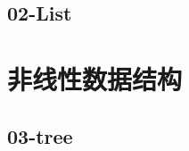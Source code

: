 \documentclass{beamer}
\begin{document}
\subsection{02-List}


% 
% 
% 
% 
% 
% 
% 
% 
% 
% 


% 
% 





\section{非线性数据结构}
\subsection{03-tree}
% 
% 
% 
% 
\end{document}
